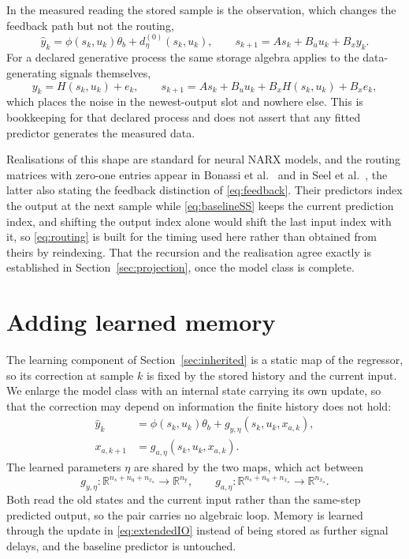 \documentclass[11pt,a4paper]{article}
\newcommand{\R}{\mathbb R}
\theoremstyle{remark}
\begin{document}
In the measured reading the stored sample is the observation, which changes the feedback path but
not the routing,
\begin{equation*}
\hat y_k=\phi(s_k,u_k)\theta_b+d_\eta^{(0)}(s_k,u_k),\qquad
s_{k+1}=As_k+B_uu_k+B_xy_k.
\end{equation*}
For a declared generative process the same storage algebra applies to the data-generating signals
themselves,
\begin{equation*}
y_k=H(s_k,u_k)+e_k,\qquad
s_{k+1}=As_k+B_uu_k+B_xH(s_k,u_k)+B_xe_k,
\end{equation*}
which places the noise in the newest-output slot and nowhere else. This is bookkeeping for that
declared process and does not assert that any fitted predictor generates the measured data.

Realisations of this shape are standard for neural NARX models, and the routing matrices with
zero-one entries appear in Bonassi et al.~\cite[Sect.~II]{bonassi2022offsetfree} and in Seel et
al.~\cite[Sect.~III]{seel2021nnmpciss}, the latter also stating the feedback distinction of
\eqref{eq:feedback}. Their predictors index the output at the next sample while
\eqref{eq:baselineSS} keeps the current prediction index, and shifting the output index alone
would shift the last input index with it, so \eqref{eq:routing} is built for the timing used here
rather than obtained from theirs by reindexing. That the recursion and the realisation agree
exactly is established in Section~\ref{sec:projection}, once the model class is complete.

\section{Adding learned memory}\label{sec:memory}
The learning component of Section~\ref{sec:inherited} is a static map of the regressor, so its
correction at sample \(k\) is fixed by the stored history and the current input. We enlarge the
model class with an internal state carrying its own update, so that the correction may depend on
information the finite history does not hold:
\begin{equation}\label{eq:extendedIO}
\begin{aligned}
\hat y_k&=\phi(s_k,u_k)\theta_b+g_{y,\eta}(s_k,u_k,x_{a,k}),\\
x_{a,k+1}&=g_{a,\eta}(s_k,u_k,x_{a,k}).
\end{aligned}
\end{equation}
The learned parameters \(\eta\) are shared by the two maps, which act between
\begin{equation*}
g_{y,\eta}:\R^{n_s+n_{\mathrm u}+n_{x_a}}\to\R^{n_{\mathrm y}},\qquad
g_{a,\eta}:\R^{n_s+n_{\mathrm u}+n_{x_a}}\to\R^{n_{x_a}}.
\end{equation*}
Both read the old states and the current input rather than the same-step predicted output, so the
pair carries no algebraic loop. Memory is learned through the update in \eqref{eq:extendedIO}
instead of being stored as further signal delays, and the baseline predictor is untouched.
\end{document}
